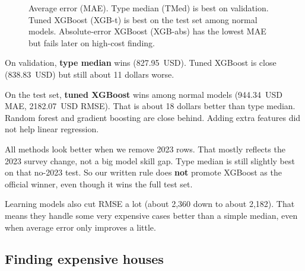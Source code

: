 \documentclass[11pt,a4paper]{article}
\begin{document}
\begin{figure}[ht]
\centering
{}
\caption{Average error (MAE). Type median (TMed) is best on validation. Tuned XGBoost (XGB-t) is best on the test set among normal models. Absolute-error XGBoost (XGB-abs) has the lowest MAE but fails later on high-cost finding.}
\label{fig:mae}
\end{figure}

On validation, \textbf{type median} wins (827.95~USD). Tuned XGBoost is close (838.83~USD) but still about 11 dollars worse.

On the test set, \textbf{tuned XGBoost} wins among normal models (944.34~USD MAE, 2182.07~USD RMSE). That is about 18 dollars better than type median. Random forest and gradient boosting are close behind. Adding extra features did not help linear regression.

All methods look better when we remove 2023 rows. That mostly reflects the 2023 survey change, not a big model skill gap. Type median is still slightly best on that no-2023 test. So our written rule does \textbf{not} promote XGBoost as the official winner, even though it wins the full test set.

Learning models also cut RMSE a lot (about 2{,}360 down to about 2{,}182). That means they handle some very expensive cases better than a simple median, even when average error only improves a little.

\subsection{Finding expensive houses}
\end{document}
